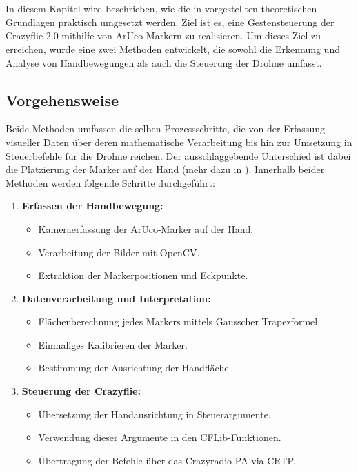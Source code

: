 \chapter{\chapThree}
\label{cha:chapter3} %

\begingroup
\fontsize{12pt}{14pt}\selectfont

In diesem Kapitel wird beschrieben, wie die in  vorgestellten theoretischen Grundlagen praktisch umgesetzt werden.
Ziel ist es, eine Gestensteuerung der Crazyflie 2.0 mithilfe von ArUco-Markern zu realisieren.
Um dieses Ziel zu erreichen, wurde eine zwei Methoden entwickelt, die sowohl die Erkennung und Analyse von Handbewegungen als auch die Steuerung der Drohne umfasst.

\section{Vorgehensweise}

Beide Methoden umfassen die selben Prozessschritte, die von der Erfassung visueller Daten über deren mathematische Verarbeitung bis hin zur Umsetzung in Steuerbefehle für die Drohne reichen.
Der ausschlaggebende Unterschied ist dabei die Platzierung der Marker auf der Hand (mehr dazu in ).
Innerhalb beider Methoden werden folgende Schritte durchgeführt:

\begin{enumerate}
    \item \textbf{Erfassen der Handbewegung:}
    \begin{itemize}
        \item Kameraerfassung der ArUco-Marker auf der Hand.
        \item Verarbeitung der Bilder mit OpenCV.
        \item Extraktion der Markerpositionen und Eckpunkte.
    \end{itemize}
    \item \textbf{Datenverarbeitung und Interpretation:}
    \begin{itemize}
        \item Flächenberechnung jedes Markers mittels Gausscher Trapezformel.
        \item Einmaliges Kalibrieren der Marker.
        \item Bestimmung der Ausrichtung der Handfläche.
    \end{itemize}
    \item \textbf{Steuerung der Crazyflie:}
    \begin{itemize}
        \item Übersetzung der Handausrichtung in Steuerargumente.
        \item Verwendung dieser Argumente in den CFLib-Funktionen.
        \item Übertragung der Befehle über das Crazyradio PA via CRTP.
    \end{itemize}
\end{enumerate}

